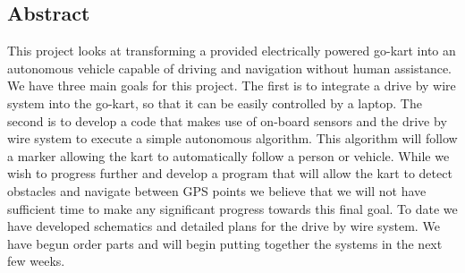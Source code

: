 \begin{center}\section*{Abstract}\end{center}
\thispagestyle{empty}

This project looks at transforming a provided electrically powered go-kart into an autonomous vehicle capable of driving and navigation without human assistance. We have three main goals for this project. The first is to integrate a drive by wire system into the go-kart, so that it can be easily controlled by a laptop. The second is to develop a code that makes use of on-board sensors and the drive by wire system to execute a simple autonomous algorithm. This algorithm will follow a marker allowing the kart to automatically follow a person or vehicle. While we wish to progress further and develop a program that will allow the kart to detect obstacles and navigate between GPS points we believe that we will not have sufficient time to make any significant progress towards this final goal. To date we have developed schematics and detailed plans for the drive by wire system. We have begun order parts and will begin putting together the systems in the next few weeks.


